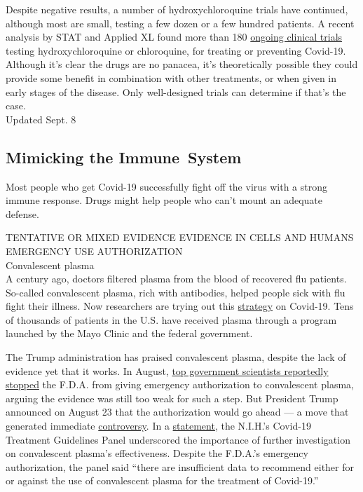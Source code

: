 Despite negative results, a number of hydroxychloroquine trials have
continued, although most are small, testing a few dozen or a few hundred
patients. A recent analysis by STAT and Applied XL found more than 180
\href{https://www.statnews.com/2020/07/06/data-show-panic-and-disorganization-dominate-the-study-of-covid-19-drugs/}{ongoing
clinical trials} testing hydroxychloroquine or chloroquine, for treating
or preventing Covid-19. Although it's clear the drugs are no panacea,
it's theoretically possible they could provide some benefit in
combination with other treatments, or when given in early stages of the
disease. Only well-designed trials can determine if that's the case.\\
Updated Sept. 8

\hypertarget{mimicking-the-immune-system}{%
\subsection{Mimicking the
Immune~System}\label{mimicking-the-immune-system}}

Most people who get Covid-19 successfully fight off the virus with a
strong immune response. Drugs might help people who can't mount an
adequate defense.

TENTATIVE OR MIXED EVIDENCE EVIDENCE IN CELLS AND HUMANS EMERGENCY USE
AUTHORIZATION\\
Convalescent plasma\\
A century ago, doctors filtered plasma from the blood of recovered flu
patients. So-called convalescent plasma, rich with antibodies, helped
people sick with flu fight their illness. Now researchers are trying out
this
\href{https://www.nytimes3xbfgragh.onion/2020/04/24/smarter-living/coronavirus-convalescent-plasma-antibodies.html?searchResultPosition=1}{strategy}
on Covid-19. Tens of thousands of patients in the U.S. have received
plasma through a program launched by the Mayo Clinic and the federal
government.

The Trump administration has praised convalescent plasma, despite the
lack of evidence yet that it works. In August,
\href{https://www.nytimes3xbfgragh.onion/2020/08/19/us/politics/blood-plasma-covid-19.html?smid=tw-share}{top
government scientists reportedly stopped} the F.D.A. from giving
emergency authorization to convalescent plasma, arguing the evidence was
still too weak for such a step. But President Trump announced on August
23 that the authorization would go ahead --- a move that generated
immediate
\href{https://www.nytimes3xbfgragh.onion/2020/08/23/us/politics/fda-plasma-coronavirus.html}{controversy}.
In a
\href{https://www.covid19treatmentguidelines.nih.gov/statement-on-convalescent-plasma-eua/}{statement},
the N.I.H.'s Covid-19 Treatment Guidelines Panel underscored the
importance of further investigation on convalescent plasma's
effectiveness. Despite the F.D.A.'s emergency authorization, the panel
said ``there are insufficient data to recommend either for or against
the use of convalescent plasma for the treatment of Covid-19.''

